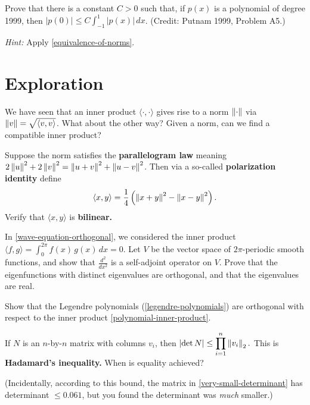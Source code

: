 \documentclass{homework}
\begin{document}
\begin{problem}
  Prove that there is a constant $C > 0$  such that,  if  $p(x)$  is a polynomial of degree 1999,  then  $|p(0)| \leq C \displaystyle\int_{-1}^1 \left|p(x)\right| \, dx$. (Credit: Putnam 1999, Problem A5.)
  
  \textit{Hint:} Apply \ref{equivalence-of-norms}.
\end{problem}

\section{Exploration}

\begin{problem}
  We have seen that an inner product $\langle \cdot,\cdot\rangle$
  gives rise to a norm $\left\lVert\cdot\right\rVert$ via
  $\left\lVert v\right\rVert = \sqrt{\langle v, v \rangle}$.  What about the other way?
  Given a norm, can we find a compatible inner product?

  Suppose the norm satisfies the \textbf{parallelogram law} meaning
  $2 \left\lVert u\right\rVert^2 + 2 \left\lVert v\right\rVert^2 = \left\lVert u+v\right\rVert^2 + \left\lVert u-v\right\rVert^2$.
  Then via a so-called \textbf{polarization identity} define \[
    \langle x, y\rangle = \frac{1}{4} \left( \left\lVert x+y\right\rVert^2 - \left\lVert x-y\right\rVert^2 \right).
  \]
  Verify that $\langle x, y\rangle$ is \textbf{bilinear.}
\end{problem}

\begin{problem}
  In \ref{wave-equation-orthogonal}, we considered the inner product
  \( \langle f,g \rangle =
    \displaystyle\int_0^{2\pi} f(x) \, g(x) \, dx = 0. \)
  Let $V$ be the vector space of $2\pi$-periodic smooth functions, and show that $\frac{d^2}{dx^2}$ is a self-adjoint operator on $V$.  Prove that the eigenfunctions with distinct eigenvalues are orthogonal, and that the eigenvalues are real.
\end{problem}

\begin{problem}\label{legendre-orthogonal}Show that the Legendre polynomials (\ref{legendre-polynomials}) are orthogonal with respect to the inner product \eqref{polynomial-inner-product}.
\end{problem}

\begin{problem}\label{hadamard-inequality}If $N$ is an $n$-by-$n$ matrix with columns $v_i$, then
\( \displaystyle\left| \det  N  \right| \leq \prod_{i=1}^n \left\lVert v_i\right\rVert_2. \)
This is \textbf{Hadamard's inequality.}  When is equality achieved?

(Incidentally, according to this bound, the matrix in \ref{very-small-determinant} has determinant $\leq 0.061$, but you found the determinant was \textit{much} smaller.)
\end{problem}
\end{document}
